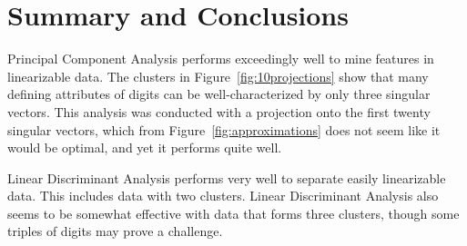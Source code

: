 \documentclass{article}
\begin{document}

\section{Summary and Conclusions}

Principal Component Analysis performs exceedingly well to mine features in linearizable data. The clusters in Figure~\ref{fig:10projections} show that many defining attributes of digits can be well-characterized by only three singular vectors. This analysis was conducted with a projection onto the first twenty singular vectors, which from Figure~\ref{fig:approximations} does not seem like it would be optimal, and yet it performs quite well.

Linear Discriminant Analysis performs very well to separate easily linearizable data. This includes data with two clusters. Linear Discriminant Analysis also seems to be somewhat effective with data that forms three clusters, though some triples of digits may prove a challenge.



\printbibliography
\end{document}

